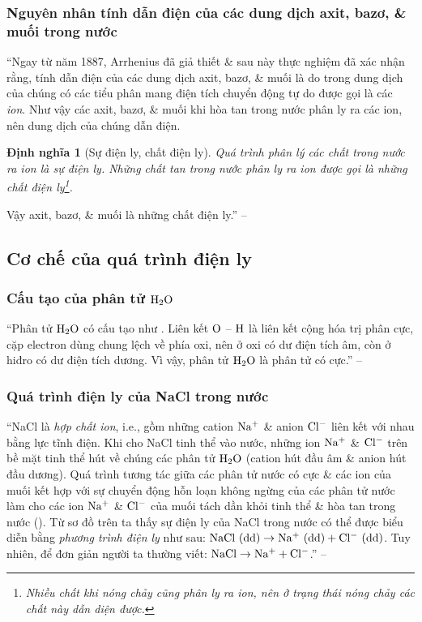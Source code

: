 \documentclass[oneside]{book}
\numberwithin{equation}{section}
\newtheorem{dinhnghia}{Định nghĩa}[section]
\begin{document}
\subsubsection{Nguyên nhân tính dẫn điện của các dung dịch axit, bazơ, \& muối trong nước}
``Ngay từ năm 1887, Arrhenius đã giả thiết \& sau này thực nghiệm đã xác nhận rằng, tính dẫn điện của các dung dịch axit, bazơ, \& muối là do trong dung dịch của chúng có các tiểu phân mang điện tích chuyển động tự do được gọi là các \textit{ion}. Như vậy các axit, bazơ, \& muối khi hòa tan trong nước phân ly ra các ion, nên dung dịch của chúng dẫn điện.

\begin{dinhnghia}[Sự điện ly, chất điện ly]
	Quá trình phân lý các chất trong nước ra ion là \emph{sự điện ly}. Những chất tan trong nước phân ly ra ion được gọi là \emph{những chất điện ly}\footnote{Nhiều chất khi nóng chảy cũng phân ly ra ion, nên ở trạng thái nóng chảy các chất này dẫn diện được.}.
\end{dinhnghia}
Vậy axit, bazơ, \& muối là những chất điện ly.'' -- \cite[p. 5]{SGK_Hoa_Hoc_11_nang_cao}

\subsection{Cơ chế của quá trình điện ly}

\subsubsection{Cấu tạo của phân tử $\rm H_2O$}
``Phân tử $\rm H_2O$ có cấu tạo như \cite[Hình 1.2: \textsf{Cấu tạo của phân tử nước. Mô hình đặc của phân tử nước}, p. 5]{SGK_Hoa_Hoc_11_nang_cao}. Liên kết $\rm O$ -- $\rm H$ là liên kết cộng hóa trị phân cực, cặp electron dùng chung lệch về phía oxi, nên ở oxi có dư điện tích âm, còn ở hiđro có dư điện tích dương. Vì vậy, phân tử $\rm H_2O$ là phân tử có cực.'' -- \cite[p. 5]{SGK_Hoa_Hoc_11_nang_cao}

\subsubsection{Quá trình điện ly của NaCl trong nước}
``NaCl là \textit{hợp chất ion}, i.e., gồm những cation $\rm Na^+$ \& anion $\rm Cl^-$  liên kết với nhau bằng lực tĩnh điện. Khi cho NaCl tinh thể vào nước, những ion $\rm Na^+$ \& $\rm Cl^-$ trên bề mặt tinh thể hút về chúng các phân tử $\rm H_2O$ (cation hút đầu âm \& anion hút đầu dương). Quá trình tương tác giữa các phân tử nước có cực \& các ion của muối kết hợp với sự chuyển động hỗn loạn không ngừng của các phân tử nước làm cho các ion $\rm Na^+$ \& $\rm Cl^-$ của muối tách dần khỏi tinh thể \& hòa tan trong nước (\cite[p. 1.3: \textsf{Sơ đồ quá trình phân ly ra ion của tinh thể NaCl trong nước}, p. 6]{SGK_Hoa_Hoc_11_nang_cao}). Từ sơ đồ trên ta thấy sự điện ly của NaCl trong nước có thể được biểu diễn bằng \textit{phương trình điện ly} như sau: $\rm NaCl\ (dd)\to Na^+\ (dd) + Cl^-\ (dd)$. Tuy nhiên, để đơn giản người ta thường viết: $\rm NaCl\to Na^+ + Cl^-$.'' -- \cite[p. 6]{SGK_Hoa_Hoc_11_nang_cao}
\end{document}
